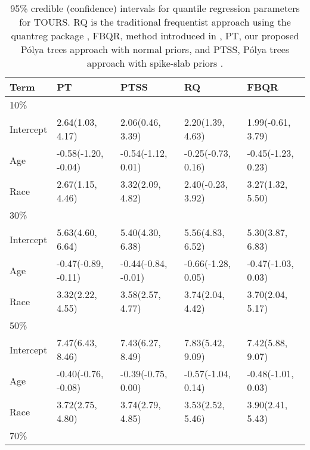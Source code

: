 \documentclass[12pt]{article}
\newcommand{\polya}{P\'{o}lya}
\begin{document}
\begin{table}[h]
  \caption[]{\label{tab:tours} 95\% credible (confidence) intervals for
    quantile regression parameters for TOURS. RQ is  the
    traditional frequentist approach using the quantreg package \citep{quantreg}, FBQR, method introduced in \cite{reich2010},
    PT, our proposed \polya{} trees approach with normal priors, and PTSS,
    \polya{} trees approach with spike-slab priors .}
  \vspace{4mm}

  \centering
  \begin{tabular}[tb]{l|l|l|l|l}
    \toprule
    Term      & PT                  & PTSS               & RQ                  & FBQR                 \\
    \hline
    10\%      &                     &                    &                     &                      \\
    Intercept & 2.64(1.03, 4.17)    & 2.06(0.46, 3.39)   & 2.20(1.39, 4.63)    & 1.99(-0.61, 3.79)    \\
    Age       & -0.58(-1.20, -0.04) & -0.54(-1.12, 0.01) & -0.25(-0.73, 0.16)  & -0.45(-1.23, 0.23)   \\
    Race      & 2.67(1.15, 4.46)    & 3.32(2.09, 4.82)   & 2.40(-0.23, 3.92)   & 3.27(1.32, 5.50)     \\
    \hline
    30\%      &                     &                    &                     &                      \\
    Intercept & 5.63(4.60, 6.64)    & 5.40(4.30, 6.38)   & 5.56(4.83, 6.52)    & 5.30(3.87, 6.83)     \\
    Age       & -0.47(-0.89, -0.11) & -0.44(-0.84, -0.01)& -0.66(-1.28, 0.05)  & -0.47(-1.03, 0.03)   \\
    Race      & 3.32(2.22, 4.55)    & 3.58(2.57, 4.77)   & 3.74(2.04, 4.42)    & 3.70(2.04, 5.17)     \\
    \hline
    50\%      &                     &                    &                     &                      \\
    Intercept & 7.47(6.43, 8.46)    & 7.43(6.27, 8.49)   & 7.83(5.42, 9.09)    & 7.42(5.88, 9.07)     \\
    Age       & -0.40(-0.76, -0.08) & -0.39(-0.75, 0.00) & -0.57(-1.04, 0.14)  & -0.48(-1.01, 0.03)   \\
    Race      & 3.72(2.75, 4.80)    & 3.74(2.79, 4.85)   & 3.53(2.52, 5.46)    & 3.90(2.41, 5.43)     \\
    \hline
    70\%      &                     &                    &                     &                      \\

\end{tabular}
\end{table}
\end{document}
